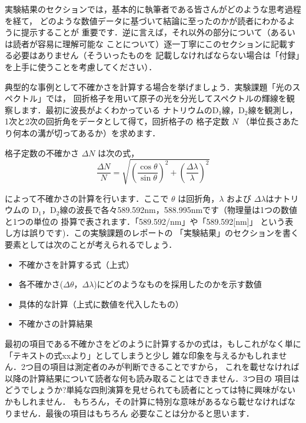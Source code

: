 \documentclass[a4paper,10pt]{jsarticle}
\begin{document}
実験結果のセクションでは，基本的に執筆者である皆さんがどのような思考過程を経て，
どのような数値データに基づいて結論に至ったのかが読者にわかるように提示することが
重要です．逆に言えば，それ以外の部分について（あるいは読者が容易に理解可能な
ことについて）逐一丁寧にこのセクションに記載する必要はありません（そういったものを
記載しなければならない場合は「付録」を上手に使うことを考慮してください）．

典型的な事例として不確かさを計算する場合を挙げましょう．実験課題「光のスペクトル」では，
回折格子を用いて原子の光を分光してスペクトルの輝線を観察します．最初に波長がよくわかっている
ナトリウムのD$_1$線，D$_2$線を観測し，1次と2次の回折角をデータとして得て，回折格子の
格子定数 $N$ （単位長さあたり何本の溝が切ってあるか）を求めます．

格子定数の不確かさ $\Delta N$ は次の式，
%
\[
\frac{\Delta N}{N}=\sqrt{\left (\frac{\cos\theta}{\sin\theta}\right )^2+\left (\frac{\Delta \lambda}{\lambda}\right )^2}
\]

\noindent
によって不確かさの計算を行います．ここで $\theta$ は回折角，$\lambda$ および $\Delta \lambda$はナトリウムの
D$_1$，D$_2$線の波長で各々589.592nm，588.995nmです（物理量は1つの数値と1つの単位の
掛算で表されます．「589.592/nm」や「589.592[nm]」 という表し方は誤りです)．この実験課題のレポートの
「実験結果」のセクションを書く要素としては次のことが考えられるでしょう．
\begin{itemize}
\setlength{\itemsep}{-3mm}
 \item 不確かさを計算する式（上式）
 \item 各不確かさ($\Delta\theta$，$\Delta\lambda$)にどのようなものを採用したのかを示す数値
 \item 具体的な計算（上式に数値を代入したもの）
 \item 不確かさの計算結果
\end{itemize}

最初の項目である不確かさをどのように計算するかの式は，もしこれがなく単に「テキストの式xxより」としてしまうと少し
雑な印象を与えるかもしれません．2つ目の項目は測定者のみが判断できることですから，
これを載せなければ以降の計算結果について読者な何も読み取ることはできません．3つ目の
項目はどうでしょうか?単純な四則演算を見せられても読者にとっては特に興味がないかもしれません．
もちろん，その計算に特別な意味があるなら載せなければなりません．最後の項目はもちろん
必要なことは分かると思います．
\end{document}
